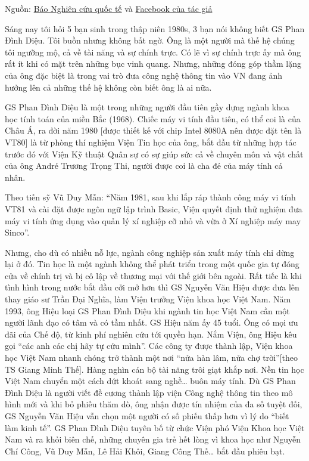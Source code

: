  
Nguồn: \href{http://nghiencuuquocte.org/forums/topic/giao-su-phan-dinh-dieu-1936-2018-khi-phach-va-tri-tue/}{Báo Nghiên cứu quốc tế} 
và \href{https://www.facebook.com/Osinhuyduc/posts/1620411811327327}{Facebook của tác giả} 




Sáng nay tôi hỏi 5 bạn sinh trong thập niên 1980s, 3 bạn nói không biết GS Phan Đình Diệu. Tôi buồn nhưng không bất ngờ. Ông là một người mà thế hệ chúng tôi ngưỡng mộ, cả về tài năng và sự chính trực. Có lẽ vì sự chính trực ấy mà ông rất ít khi có mặt trên những bục vinh quang. Nhưng, những đóng góp thầm lặng của ông đặc biệt là trong vai trò đưa công nghệ thông tin vào VN đang ảnh hưởng lên cả những thế hệ không còn biết ông là ai nữa.
 

 
GS Phan Đình Diệu là một trong những người đầu tiên gầy dựng ngành khoa học tính toán của miền Bắc (1968). Chiếc máy vi tính đầu tiên, có thể coi là của Châu Á, ra đời năm 1980 [được thiết kế với chip Intel 8080A nên được đặt tên là VT80] là từ phòng thí nghiệm Viện Tin học của ông, bắt đầu từ những hợp tác trước đó với Viện Kỹ thuật Quân sự có sự giúp sức cả về chuyên môn và vật chất của ông André Trương Trọng Thi, người được coi là cha đẻ của máy tính cá nhân.

Theo tiến sỹ Vũ Duy Mẫn: “Năm 1981, sau khi lắp ráp thành công máy vi tính VT81 và cài đặt được ngôn ngữ lập trình Basic, Viện quyết định thử nghiệm đưa máy vi tính ứng dụng vào quản lý xí nghiệp cỡ nhỏ và vừa ở Xí nghiệp máy may Sinco”.

Nhưng, cho dù có nhiều nỗ lực, ngành công nghiệp sản xuất máy tính chỉ dừng lại ở đó. Tin học là một ngành không thể phát triển trong một quốc gia tự đóng cửa về chính trị và bị cô lập về thương mại với thế giới bên ngoài. Rất tiếc là khi tình hình trong nước bắt đầu cởi mở hơn thì GS Nguyễn Văn Hiệu được đưa lên thay giáo sư Trần Đại Nghĩa, làm Viện trưởng Viện khoa học Việt Nam. Năm 1993, ông Hiệu loại GS Phan Đình Diệu khi ngành tin học Việt Nam cần một người lãnh đạo có tâm và có tầm nhất.
GS Hiệu năm ấy 45 tuổi. Ông có mọi ưu đãi của Chế độ, từ kinh phí nghiên cứu tới quyền hạn. Nắm Viện, ông Hiệu kêu gọi “các anh các chị hãy tự cứu mình”. Các công ty được thành lập, Viện khoa học Việt Nam nhanh chóng trở thành một nơi “nửa hàn lâm, nửa chợ trời”[theo TS Giang Minh Thế]. Hàng nghìn cán bộ tài năng trôi giạt khắp nơi. Nền tin học Việt Nam chuyển một cách dứt khoát sang nghề… buôn máy tính.
Dù GS Phan Đình Diệu là người viết đề cương thành lập viện Công nghệ thông tin theo mô hình mới và khi bỏ phiếu thăm dò, ông nhận được tín nhiệm của đa số tuyệt đối, GS Nguyễn Văn Hiệu vẫn chọn một người có số phiếu thấp hơn vì lý do “biết làm kinh tế”. GS Phan Đình Diệu tuyên bố từ chức Viện phó Viện Khoa học Việt Nam và ra khỏi biên chế, những chuyên gia trẻ hết lòng vì khoa học như Nguyễn Chí Công, Vũ Duy Mẫn, Lê Hải Khôi, Giang Công Thế… bắt đầu phiêu bạt.

